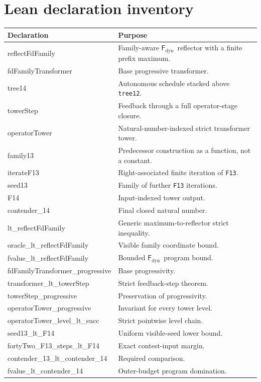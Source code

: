 \documentclass[11pt]{article}
\theoremstyle{definition}
\newcommand{\Fd}{\ensuremath{\mathsf{F}_{\mathrm{dyn}}}}
\newcommand{\lean}[1]{\texttt{#1}}
\begin{document}
\appendix
\section{Lean declaration inventory}

\begin{longtable}{>{\ttfamily\raggedright\arraybackslash}p{}
                  >{\raggedright\arraybackslash}p{}}
\toprule
\normalfont Declaration & Purpose \\
\midrule
\endhead
reflectFdFamily & Family-aware \Fd\ reflector with a finite prefix maximum. \\
fdFamilyTransformer & Base progressive transformer. \\
tree14 & Autonomous schedule stacked above \lean{tree12}. \\
towerStep & Feedback through a full operator-stage closure. \\
operatorTower & Natural-number-indexed strict transformer tower. \\
family13 & Predecessor construction as a function, not a constant. \\
iterateF13 & Right-associated finite iteration of \lean{F13}. \\
seed13 & Family of further \lean{F13} iterations. \\
F14 & Input-indexed tower output. \\
contender\_14 & Final closed natural number. \\
lt\_reflectFdFamily & Generic maximum-to-reflector strict inequality. \\
oracle\_lt\_reflectFdFamily & Visible family coordinate bound. \\
fvalue\_lt\_reflectFdFamily & Bounded \Fd\ program bound. \\
fdFamilyTransformer\_progressive & Base progressivity. \\
transformer\_lt\_towerStep & Strict feedback-step theorem. \\
towerStep\_progressive & Preservation of progressivity. \\
operatorTower\_progressive & Invariant for every tower level. \\
operatorTower\_level\_lt\_succ & Strict pointwise level chain. \\
seed13\_lt\_F14 & Uniform visible-seed lower bound. \\
fortyTwo\_F13\_steps\_lt\_F14 & Exact contest-input margin. \\
contender\_13\_lt\_contender\_14 & Required comparison. \\
fvalue\_lt\_contender\_14 & Outer-budget program domination. \\
\bottomrule
\end{longtable}
\end{document}
